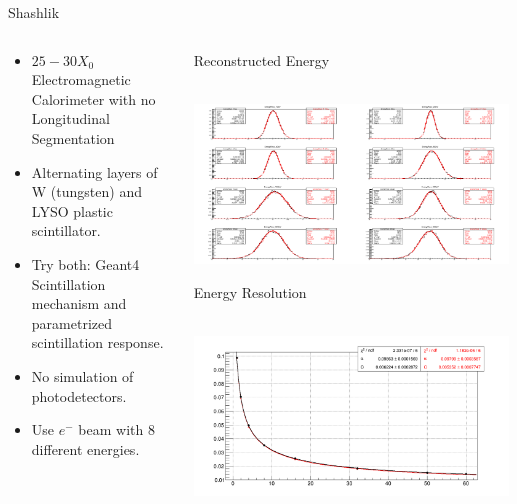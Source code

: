 \documentclass[pdf, 9pt]{beamer}
\begin{document}
  \begin{frame}{Shashlik}
    \begin{columns}[T]
      \begin{column}{0.6\textwidth}
        \begin{itemize}
          \item $25-30 X_{0}$ Electromagnetic Calorimeter with \alert{no Longitudinal Segmentation}
          \item Alternating layers of W (tungsten) and LYSO plastic scintillator.
          \item Try both: Geant4 Scintillation mechanism and \alert{parametrized scintillation response}.
          \item No simulation of photodetectors.
          \item Use $e^{-}$ beam with 8 different energies.
        \end{itemize}
      \end{column}
      \begin{column}{0.4\textwidth}
          \begin{tiny}Reconstructed Energy\end{tiny}\\
          \includegraphics[width=0.99\textwidth, height=0.4\textheight]{figs/shashlik_smallscale/energyRecoDistributions.png}\\
          \begin{tiny}Energy Resolution\end{tiny}\\
          \includegraphics[width=0.99\textwidth, height=0.4\textheight]{figs/shashlik_smallscale/energyResolution.png}
      \end{column}
    \end{columns}
  \end{frame}
\end{document}
